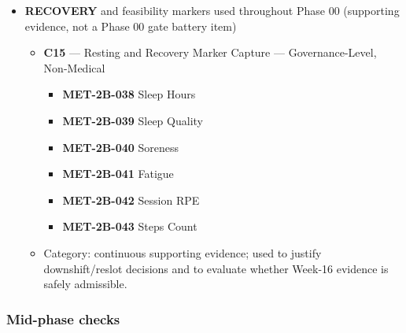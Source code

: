 \documentclass[10pt]{article}
\begin{document}
\begin{itemize}
\item \textbf{RECOVERY} and feasibility markers used throughout Phase 00 (supporting evidence, not a Phase 00 gate battery item)
  \begin{itemize}
  \item \textbf{C15} — Resting and Recovery Marker Capture — Governance-Level, Non-Medical
    \begin{itemize}
    \item \textbf{MET-2B-038} Sleep Hours
    \item \textbf{MET-2B-039} Sleep Quality
    \item \textbf{MET-2B-040} Soreness
    \item \textbf{MET-2B-041} Fatigue
    \item \textbf{MET-2B-042} Session RPE
    \item \textbf{MET-2B-043} Steps Count
    \end{itemize}
  \item Category: continuous supporting evidence; used to justify downshift/reslot decisions and to evaluate whether Week-16 evidence is safely admissible.
  \end{itemize}
\end{itemize}

\subsubsection*{Mid-phase checks}
\end{document}
